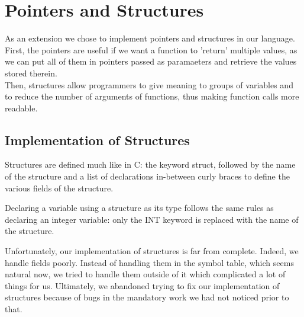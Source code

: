 \documentclass{article}
\begin{document}
\section{Pointers and Structures}
As an extension we chose to implement pointers and structures in our language. First, the pointers are useful
if we want a function to 'return' multiple values, as we can put all of them in pointers passed as paramaeters and retrieve the values stored therein.\\
Then, structures allow programmers to give meaning to groups of variables and to reduce the number of arguments of functions, thus making function calls more readable. 

\subsection{Implementation of Structures}

Structures are defined much like in C: the keyword struct, followed by the name of the structure and a list of declarations in-between curly braces to define the various fields of the structure.

Declaring a variable using a structure as its type follows the same rules as declaring an integer variable: only the INT keyword is replaced with the name of the structure.

Unfortunately, our implementation of structures is far from complete. Indeed, we handle fields poorly. Instead of handling them in the symbol table, which seems natural now, we tried to handle them outside of it which complicated a lot of things for us. Ultimately, we abandoned trying to fix our implementation of structures because of bugs in the mandatory work we had not noticed prior to that.
\end{document}
